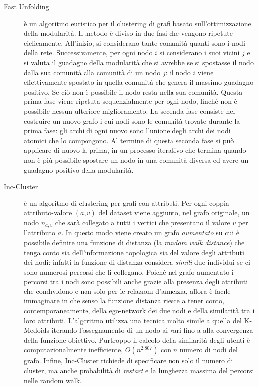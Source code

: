\begin{description}
\item [Fast Unfolding] \`e un algoritmo euristico per il clustering di grafi basato sull'ottimizzazione della modularit\`a. Il metodo \`e diviso in due fasi che vengono ripetute ciclicamente. All'inizio, si considerano tante comunit\`a quanti sono i nodi della rete. Successivamente, per ogni nodo $ i $ si considerano i suoi vicini $ j $ e si valuta il guadagno della modularit\`a che si avrebbe se si spostasse il nodo dalla sua comunit\`a alla comunit\`a di un nodo $ j $: il nodo $ i $ viene effettivamente spostato in quella comunit\`a che genera il massimo guadagno positivo. Se ci\`o non \`e possibile il nodo resta nella sua comunit\`a. Questa prima fase viene ripetuta sequenzialmente per ogni nodo, finch\'e non \`e possibile nessun ulteriore miglioramento. La seconda fase consiste nel costruire un nuovo grafo i cui nodi sono le comunit\`a trovate durante la prima fase: gli archi di ogni nuovo  sono l'unione degli archi dei nodi atomici che lo compongono. Al termine di questa seconda fase si pu\`o applicare di nuovo la prima, in un processo iterativo che termina quando non \`e pi\`u possibile spostare un nodo in una comunit\`a diversa ed avere un guadagno positivo della modularit\`a.
\item [Inc-Cluster] \`e un algoritmo di clustering per grafi con attributi. Per ogni coppia attributo-valore $ (a, v) $ del dataset viene aggiunto, nel grafo originale, un nodo $ n_{a,v} $ che sar\`a collegato a tutti i vertici che presentano il valore $ v $ per l'attributo $ a $. In questo modo viene creato un grafo \textit{aumentato} su cui \`e possibile definire una funzione di distanza (la \textit{random walk distance}) che tenga conto sia dell'informazione topologica sia del valore degli attributi dei nodi: infatti la funzione di distanza considera \textit{simili} due individui se ci sono numerosi percorsi che li collegano. Poich\'e nel grafo aumentato i percorsi tra i nodi sono possibili anche grazie alla presenza degli attributi che condividono e non solo per le relazioni d'amicizia, allora \`e facile immaginare in che senso la funzione distanza riesce a tener conto, contemporaneamente, della ego-network dei due nodi e della similarit\`a tra i loro attributi. L'algoritmo utilizza una tecnica molto simile a quella del K-Medoids iterando l'assegnamento di un nodo ai vari  fino a alla convergenza della funzione obiettivo. Purtroppo il calcolo della similarit\`a degli utenti \`e computazionalmente inefficiente, $ O(n^{2.807}) $ con $ n $ numero di nodi del grafo. Infine, Inc-Cluster richiede di specificare non solo il numero di cluster, ma anche probabilit\`a di \textit{restart} e la lunghezza massima del percorsi nelle random walk.

\end{description}
